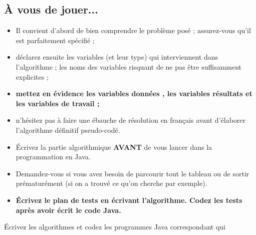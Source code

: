 \documentclass[11pt,a4paper]{article}
\begin{document}
        \subsection{\`A vous de jouer...}
					\begin{itemize}
				
			\item Il convient d'abord de bien comprendre le probl\`eme pos\'e ; assurez-vous qu'il est parfaitement sp\'ecifi\'e ;
			\item d\'eclarez ensuite les variables (et leur type) qui interviennent dans l'algorithme ; les noms des variables risquant de ne pas \^etre suffisamment explicites ;
			\item \textbf{mettez en \'evidence les variables \guillemotleft  donn\'ees \guillemotright , les variables \guillemotleft  r\'esultats \guillemotright  et les variables de travail ;}
			\item n'h\'esitez pas \`a faire une \'ebauche de r\'esolution en fran\c cais avant d'\'elaborer l'algorithme d\'efinitif pseudo-cod\'e.
			\item \'Ecrivez la partie algorithmique \textbf{AVANT} de vous lancer dans la programmation en Java.
			\item Demandez-vous si vous avez besoin de parcourir tout le tableau ou de sortir pr\'ematur\'ement (si on a trouv\'e ce qu'on cherche par exemple).
			\item \textbf{\'Ecrivez le plan de tests en \'ecrivant l'algorithme. Codez les tests apr\`es avoir \'ecrit le code Java.}
					\end{itemize}
				
            \par
        
        \'Ecrivez les algorithmes et codez les programmes Java correspondant qui 
          
\end{document}
